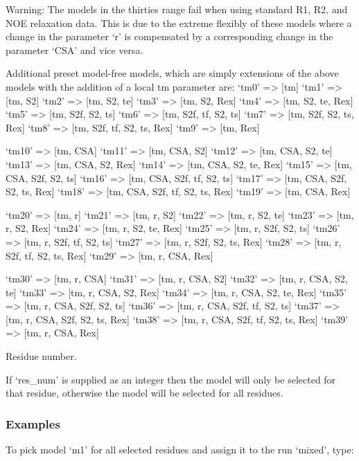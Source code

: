 Warning:  The models in the thirties range fail when using standard R1, R2, and NOE
relaxation data.  This is due to the extreme flexibly of these models where a change in the
parameter `r' is compensated by a corresponding change in the parameter `CSA' and
vice versa.


Additional preset model-free models, which are simply extensions of the above models with
the addition of a local tm parameter are:
    `tm0'   => [tm]
    `tm1'   => [tm, S2]
    `tm2'   => [tm, S2, te]
    `tm3'   => [tm, S2, Rex]
    `tm4'   => [tm, S2, te, Rex]
    `tm5'   => [tm, S2f, S2, ts]
    `tm6'   => [tm, S2f, tf, S2, ts]
    `tm7'   => [tm, S2f, S2, ts, Rex]
    `tm8'   => [tm, S2f, tf, S2, ts, Rex]
    `tm9'   => [tm, Rex]

    `tm10'  => [tm, CSA]
    `tm11'  => [tm, CSA, S2]
    `tm12'  => [tm, CSA, S2, te]
    `tm13'  => [tm, CSA, S2, Rex]
    `tm14'  => [tm, CSA, S2, te, Rex]
    `tm15'  => [tm, CSA, S2f, S2, ts]
    `tm16'  => [tm, CSA, S2f, tf, S2, ts]
    `tm17'  => [tm, CSA, S2f, S2, ts, Rex]
    `tm18'  => [tm, CSA, S2f, tf, S2, ts, Rex]
    `tm19'  => [tm, CSA, Rex]

    `tm20'  => [tm, r]
    `tm21'  => [tm, r, S2]
    `tm22'  => [tm, r, S2, te]
    `tm23'  => [tm, r, S2, Rex]
    `tm24'  => [tm, r, S2, te, Rex]
    `tm25'  => [tm, r, S2f, S2, ts]
    `tm26'  => [tm, r, S2f, tf, S2, ts]
    `tm27'  => [tm, r, S2f, S2, ts, Rex]
    `tm28'  => [tm, r, S2f, tf, S2, ts, Rex]
    `tm29'  => [tm, r, CSA, Rex]

    `tm30'  => [tm, r, CSA]
    `tm31'  => [tm, r, CSA, S2]
    `tm32'  => [tm, r, CSA, S2, te]
    `tm33'  => [tm, r, CSA, S2, Rex]
    `tm34'  => [tm, r, CSA, S2, te, Rex]
    `tm35'  => [tm, r, CSA, S2f, S2, ts]
    `tm36'  => [tm, r, CSA, S2f, tf, S2, ts]
    `tm37'  => [tm, r, CSA, S2f, S2, ts, Rex]
    `tm38'  => [tm, r, CSA, S2f, tf, S2, ts, Rex]
    `tm39'  => [tm, r, CSA, Rex]



Residue number.

If `res\_num' is supplied as an integer then the model will only be selected for that
residue, otherwise the model will be selected for all residues.



\subsubsection{Examples}

To pick model `m1' for all selected residues and assign it to the run `mixed', type:

